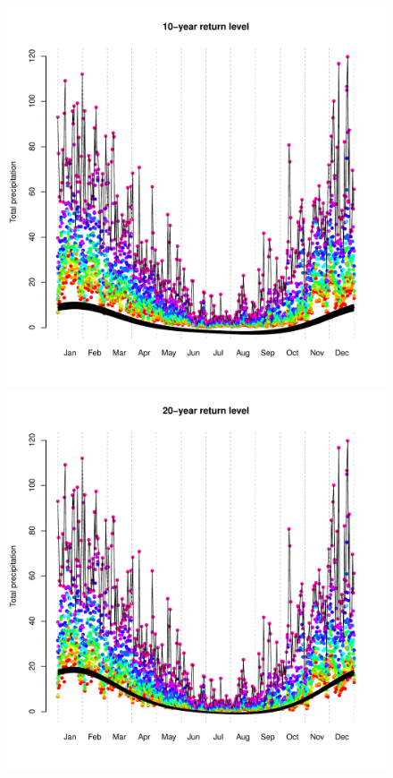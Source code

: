 \documentclass[12pt]{article}
\begin{document}
\begin{figure}[H]
\begin{center}
\includegraphics[scale=0.30]{../figs/return10.pdf}
\includegraphics[scale=0.30]{../figs/return20.pdf}

\end{center}
\end{figure}
\end{document}
